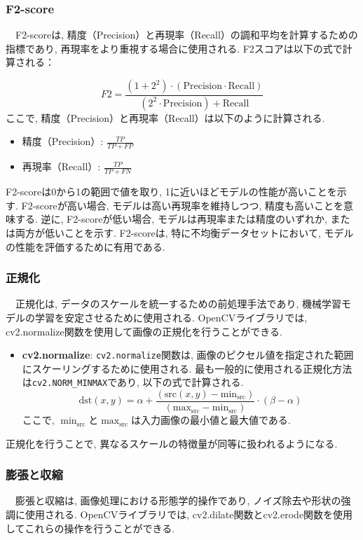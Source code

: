 \documentclass[a4paper, 12pt]{report}
\begin{document}
\subsubsection{F2-score}
　F2-scoreは, 精度（Precision）と再現率（Recall）の調和平均を計算するための指標であり, 再現率をより重視する場合に使用される. F2スコアは以下の式で計算される：

\[
F2 = \frac{(1 + 2^2) \cdot (\text{Precision} \cdot \text{Recall})}{(2^2 \cdot \text{Precision}) + \text{Recall}}
\]ここで, 精度（Precision）と再現率（Recall）は以下のように計算される. 

\begin{itemize}
    \item 精度（Precision）: \(\frac{TP}{TP + FP}\)
    \item 再現率（Recall）: \(\frac{TP}{TP + FN}\)
\end{itemize}F2-scoreは0から1の範囲で値を取り, 1に近いほどモデルの性能が高いことを示す. F2-scoreが高い場合, モデルは高い再現率を維持しつつ, 精度も高いことを意味する. 逆に, F2-scoreが低い場合, モデルは再現率または精度のいずれか, または両方が低いことを示す. F2-scoreは, 特に不均衡データセットにおいて, モデルの性能を評価するために有用である. 

\subsubsection{正規化}
　正規化は, データのスケールを統一するための前処理手法であり, 機械学習モデルの学習を安定させるために使用される. OpenCVライブラリでは, cv2.normalize関数を使用して画像の正規化を行うことができる. 

\begin{itemize}
    \item \textbf{cv2.normalize}:
        \texttt{cv2.normalize}関数は, 画像のピクセル値を指定された範囲にスケーリングするために使用される. 最も一般的に使用される正規化方法は\texttt{cv2.NORM\_MINMAX}であり, 以下の式で計算される. 
        \[
        \text{dst}(x, y) = \alpha + \frac{(\text{src}(x, y) - \text{min}_{\text{src}})}{(\text{max}_{\text{src}} - \text{min}_{\text{src}})} \cdot (\beta - \alpha)
        \]
        ここで, \(\min_{\text{src}}\)と\(\max_{\text{src}}\)は入力画像の最小値と最大値である. 
\end{itemize}
正規化を行うことで, 異なるスケールの特徴量が同等に扱われるようになる. 
\subsubsection{膨張と収縮}
　膨張と収縮は, 画像処理における形態学的操作であり, ノイズ除去や形状の強調に使用される. OpenCVライブラリでは, cv2.dilate関数とcv2.erode関数を使用してこれらの操作を行うことができる. 
\end{document}
